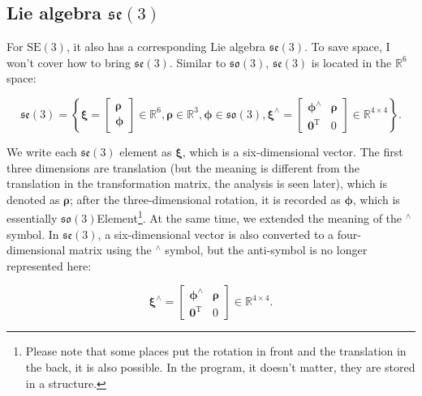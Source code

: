 \subsection{Lie algebra $\mathfrak{se}(3)$}

For $\mathrm{SE}(3)$, it also has a corresponding Lie algebra $\mathfrak{se}(3)$. To save space, I won't cover how to bring $\mathfrak{se}(3)$. Similar to $\mathfrak{so}(3)$, $\mathfrak{se}(3)$ is located in the $\mathbb{R}^6$ space:

\begin{equation}
\mathfrak{se}(3) = \left\{ { \boldsymbol{\xi} = \left[ \begin{array}{l}
	\boldsymbol{\rho} \\
	\boldsymbol{\phi} 
	\end{array} \right]
	 \in { \mathbb{R}^6} ,
	 \boldsymbol{\rho} \in { \mathbb{R}^3}, \boldsymbol{\phi} \in \mathfrak{so} \left( 3 \right),{ \boldsymbol{\xi} ^ \wedge } = \left[ {\begin{array}{*{20}{c}}
		{{ \boldsymbol{\phi} ^ \wedge }}& \boldsymbol{\rho} \\
		{{\bm{0}^\mathrm{T}}}&0
		\end{array}} \right] \in { \mathbb{R}^{4 \times 4}}} \right\}.
\end{equation}

We write each $\mathfrak{se}(3)$ element as $\boldsymbol{\xi}$, which is a six-dimensional vector. The first three dimensions are translation (but the meaning is different from the translation in the transformation matrix, the analysis is seen later), which is denoted as $\boldsymbol{\rho}$; after the three-dimensional rotation, it is recorded as $\boldsymbol{\phi}$, which is essentially $\mathfrak{so}(3)$Element\footnote{Please note that some places put the rotation in front and the translation in the back, it is also possible. In the program, it doesn't matter, they are stored in a structure. }. At the same time, we extended the meaning of the $^\wedge$ symbol. In $\mathfrak{se}(3)$, a six-dimensional vector is also converted to a four-dimensional matrix using the $^\wedge$ symbol, but the anti-symbol is no longer represented here:

\begin{equation}
{ \boldsymbol{\xi} ^ \wedge } = \left[ {\begin{array}{*{20}{c}}
	{{ \boldsymbol{\phi} ^ \wedge }}& \boldsymbol{\rho} \\
	{{\bm{0}^\mathrm{T}}}&0
	\end{array}} \right] \in { \mathbb{R}^{4 \times 4}}.
\end{equation}

